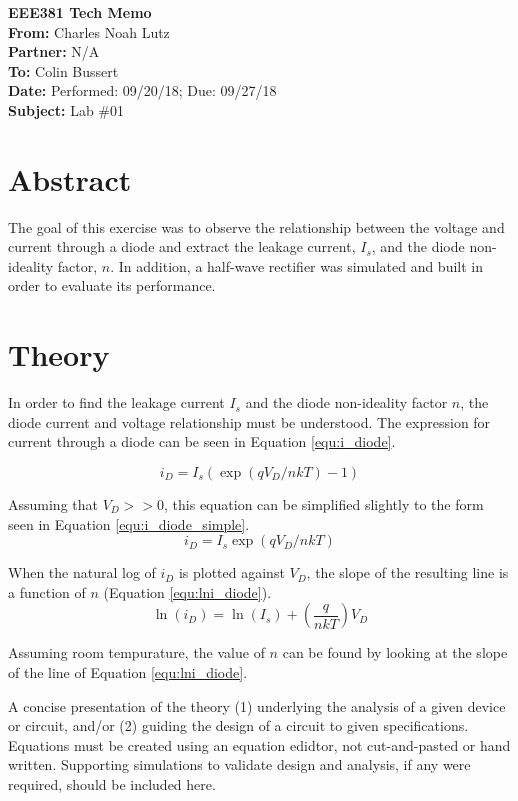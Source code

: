 \documentclass[11pt]{article}
\begin{document}
	{\Huge\textbf{EEE381 Tech Memo}}\\
	\hfill \break
	\textbf{From:} Charles Noah Lutz\\
	\textbf{Partner:} N/A\\
	\textbf{To:} Colin Bussert\\
	\textbf{Date:} Performed: 09/20/18; Due: 09/27/18\\
	\textbf{Subject:} Lab \#01

	\section{Abstract}
	The goal of this exercise was to observe the relationship between the
	voltage and current through a diode and extract the leakage current, \(I_{s}\), and
	the diode non-ideality factor, \(n\). In addition, a half-wave rectifier was simulated
	and built in order to evaluate its performance.

	\section{Theory}
	In order to find the leakage current \(I_{s}\) and the diode non-ideality factor \(n\),
	the diode current and voltage relationship must be understood. The expression for 
	current through a diode can be seen in Equation \ref{equ:i_diode}.

	\begin{equation}
		\label{equ:i_diode}
		i_{D} = I_{s} (\exp(qV_{D}/nkT)-1)
	\end{equation}

	Assuming that \(V_{D} >> 0\), this equation can be simplified slightly to the form
	seen in Equation \ref{equ:i_diode_simple}.
	\begin{equation}
		\label{equ:i_diode_simple}
		i_{D} = I_{s} \exp(qV_{D}/nkT)
	\end{equation}
	
	When the natural log of \(i_{D}\) is plotted against \(V_{D}\), the slope of the
	resulting line is a function of \(n\) (Equation \ref{equ:lni_diode}).
	\begin{equation}
		\label{equ:lni_diode}
		\ln(i_{D}) = \ln(I_{s}) + (\frac{q}{nkT})V_{D}
	\end{equation}

	Assuming room tempurature, the value of \(n\) can be found by looking at the slope
	of the line of Equation \ref{equ:lni_diode}.

	A concise presentation of the theory (1) underlying the analysis of a given
	device or circuit, and/or (2) guiding the design of a circuit to given 
	specifications. Equations must be created using an equation edidtor, not
	cut-and-pasted or hand written. Supporting simulations to validate design
	and analysis, if any were required, should be included here.
\end{document}
